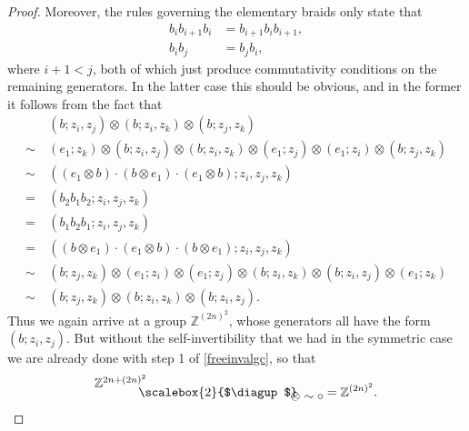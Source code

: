 \documentclass{amsbook} %
\newcommand{\bigquotient}[2]{ \raisebox{0.75\height}{$#1$} \mkern-12mu\scalebox{2}{$\diagup$}\mkern-10mu \raisebox{-0.5\height}{$#2$} }
\numberwithin{section}{chapter}
\begin{document}
\begin{proof}
Moreover, the rules governing the elementary braids only state that
  \begin{align*}
    b_i b_{i+1} b_i &= b_{i+1} b_i b_{i+1},\\
    b_i b_j &= b_j b_i,
  \end{align*}
where $i+1 < j$, both of which just produce commutativity conditions on the remaining generators. In the latter case this should be obvious, and in the former it follows from the fact that
  \begin{align*}
		&(  b  ;  z_i, z_j  )  \otimes  (  b  ;  z_i, z_k  )  \otimes  (  b  ;  z_j, z_k  ) \\
		\sim~&(e_1; z_k) \otimes (  b  ;  z_i, z_j  ) \otimes (  b  ;  z_i, z_k  ) \otimes (e_1; z_j) \otimes (e_1; z_i) \otimes (  b  ;  z_j, z_k  )\\
		\sim~&\left(  (e_1 \otimes b) \cdot (b \otimes e_1) \cdot (e_1 \otimes b)  ;  z_i, z_j, z_k  \right) \\	
		=~&(  b_2 b_1 b_2  ;  z_i, z_j, z_k  ) \\
		=~&(  b_1 b_2 b_1  ;  z_i, z_j, z_k  ) \\
		=~&\left(  (b \otimes e_1) \cdot (e_1 \otimes b) \cdot (b \otimes e_1)  ;  z_i, z_j, z_k  \right) \\
		\sim~&(  b ;  z_j, z_k  ) \otimes (e_1; z_i) \otimes (e_1; z_j) \otimes (  b  ;  z_i, z_k  ) \otimes (  b  ;  z_i, z_j  ) \otimes (e_1; z_k) \\
		\sim~&(  b  ;  z_j, z_k  ) \otimes (  b  ;  z_i, z_k  ) \otimes (  b  ;  z_i, z_j  ).
  \end{align*}
Thus we again arrive at a group $\mathbb{Z}^{(2n)^2}$, whose generators all have the form $(b; z_i, z_j)$. But without the self-invertibility that we had in the symmetric case we are already done with step 1 of \cref{freeinvalgc}, so that
  \[
    \bigquotient{\mathbb{Z}^{2n + (2n)^2}}{\otimes \sim \circ} = \mathbb{Z}^{(2n)^2}.
  \]


\end{proof}
\end{document}
